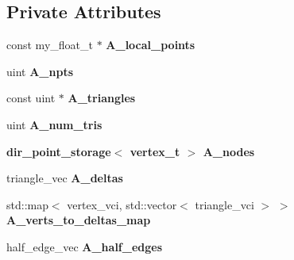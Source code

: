 \subsection*{Private Attributes}
\begin{CompactItemize}
\item 
const my\_\-float\_\-t $\ast$ \textbf{A\_\-local\_\-points}\label{classSimSite3D_1_1geometry_1_1TriMeshSphere_7ace9bbea8fff45d3dfb5d915adb664e}

\item 
uint \textbf{A\_\-npts}\label{classSimSite3D_1_1geometry_1_1TriMeshSphere_098883f74c0eed5ecc66f428f48d70a0}

\item 
const uint $\ast$ \textbf{A\_\-triangles}\label{classSimSite3D_1_1geometry_1_1TriMeshSphere_af90c5e36bec515b764a6394ba50ac4a}

\item 
uint \textbf{A\_\-num\_\-tris}\label{classSimSite3D_1_1geometry_1_1TriMeshSphere_0775a1f564a7b75cda3723d1a4806ceb}

\item 
\bf{dir\_\-point\_\-storage}$<$ \bf{vertex\_\-t} $>$ \textbf{A\_\-nodes}\label{classSimSite3D_1_1geometry_1_1TriMeshSphere_dbc874022d8fcc737354707cfaccb77d}

\item 
triangle\_\-vec \textbf{A\_\-deltas}\label{classSimSite3D_1_1geometry_1_1TriMeshSphere_d5d4d2dcd06c55fc25e58b49be8c2de3}

\item 
std::map$<$ vertex\_\-vci, std::vector$<$ triangle\_\-vci $>$ $>$ \textbf{A\_\-verts\_\-to\_\-deltas\_\-map}\label{classSimSite3D_1_1geometry_1_1TriMeshSphere_bfb7fca04fe4b2c9245035607914dd47}

\item 
half\_\-edge\_\-vec \textbf{A\_\-half\_\-edges}\label{classSimSite3D_1_1geometry_1_1TriMeshSphere_f808f7f4a48e4ad6ee7b24a1002fdfbd}

\end{CompactItemize}
